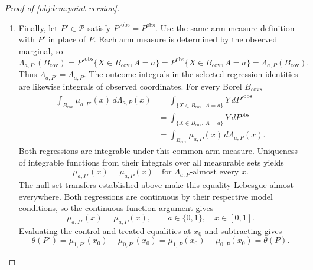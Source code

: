 \begin{proof}[Proof of \cref{obj:lem:point-version}]
\begin{enumerate}
\item Finally, let \(P'\in\mathcal P\) satisfy \(P'^{\mathrm{obs}}=P^{\mathrm{obs}}\). Use the same arm-measure definition with \(P'\) in place of \(P\). Each arm measure is determined by the observed marginal, so
\[
\Lambda_{a,P'}(B_{\mathrm{cov}})
=P'^{\mathrm{obs}}\{X\in B_{\mathrm{cov}},A=a\}
=P^{\mathrm{obs}}\{X\in B_{\mathrm{cov}},A=a\}
=\Lambda_{a,P}(B_{\mathrm{cov}}).
\]
Thus \(\Lambda_{a,P'}=\Lambda_{a,P}\). The outcome integrals in the selected regression identities are likewise integrals of observed coordinates. For every Borel \(B_{\mathrm{cov}}\),
\[
\begin{aligned}
\int_{B_{\mathrm{cov}}}\mu_{a,P'}(x)\,d\Lambda_{a,P}(x)
&=\int_{\{X\in B_{\mathrm{cov}},\,A=a\}}Y\,dP'^{\mathrm{obs}}\\
&=\int_{\{X\in B_{\mathrm{cov}},\,A=a\}}Y\,dP^{\mathrm{obs}}\\
&=\int_{B_{\mathrm{cov}}}\mu_{a,P}(x)\,d\Lambda_{a,P}(x).
\end{aligned}
\]
Both regressions are integrable under this common arm measure. Uniqueness of integrable functions from their integrals over all measurable sets yields
\[
\mu_{a,P'}(x)=\mu_{a,P}(x)
\quad\text{for }\Lambda_{a,P}\text{-almost every }x.
\]
The null-set transfers established above make this equality Lebesgue-almost everywhere. Both regressions are continuous by their respective model conditions, so the continuous-function argument gives
\[
\mu_{a,P'}(x)=\mu_{a,P}(x),
\qquad a\in\{0,1\},\quad x\in[0,1].
\]
Evaluating the control and treated equalities at \(x_0\) and subtracting gives
\[
\theta(P')
=\mu_{1,P'}(x_0)-\mu_{0,P'}(x_0)
=\mu_{1,P}(x_0)-\mu_{0,P}(x_0)
=\theta(P).
\] %
\end{enumerate}
\end{proof}
